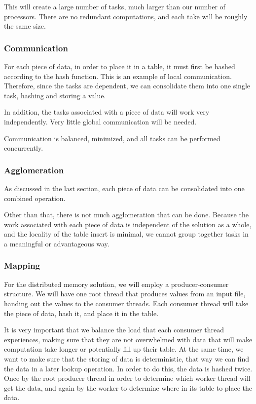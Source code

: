 \documentclass{article}
\begin{document}
This will create a large number of tasks, much larger than our number of processors. There are no redundant computations, and each take will be roughly the same size.

\subsubsection{Communication}
For each piece of data, in order to place it in a table, it must first be hashed according to the hash function. This is an example of local communication. Therefore, since the tasks are dependent, we can consolidate them into one single task, hashing and storing a value.

In addition, the tasks associated with a piece of data will work very independently. Very little global communication will be needed.

Communication is balanced, minimized, and all tasks can be performed concurrently.

\subsubsection{Agglomeration}
As discussed in the last section, each piece of data can be consolidated into one combined operation.

Other than that, there is not much agglomeration that can be done. Because the work associated with each piece of data is independent of the solution as a whole, and the locality of the table insert is minimal, we cannot group together tasks in a meaningful or advantageous way.

\subsubsection{Mapping}
For the distributed memory solution, we will employ a producer-consumer structure. We will have one root thread that produces values from an input file, handing out the values to the consumer threads. Each consumer thread will take the piece of data, hash it, and place it in the table.

It is very important that we balance the load that each consumer thread experiences, making sure that they are not overwhelmed with data that will make computation take longer or potentially fill up their table. At the same time, we want to make sure that the storing of data is deterministic, that way we can find the data in a later lookup operation. In order to do this, the data is hashed twice. Once by the root producer thread in order to determine which worker thread will get the data, and again by the worker to determine where in its table to place the data.
\end{document}
